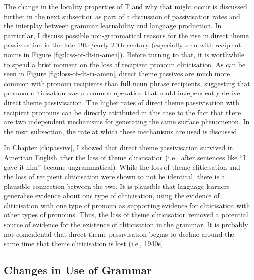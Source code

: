	The change in the locality properties of T and why that might occur is discussed further in the next subsection as part of a discussion of passivisation rates and the interplay between grammar learnability and language production. In particular, I discuss possible non-grammatical reasons for the rise in direct theme passivisation in the late 19th/early 20th century (especially seen with recipient nouns in Figure \ref{fig:loss-of-dt-in-amen}). Before turning to that, it is worthwhile to spend a brief moment on the loss of recipient pronoun cliticisation. As can be seen in Figure \ref{fig:loss-of-dt-in-amen}, direct theme passives are much more common with pronoun recipients than full noun phrase recipients, suggesting that pronoun cliticisation was a common operation that could independently derive direct theme passivisation. The higher rates of direct theme passivisation with recipient pronouns can be directly attributed in this case to the fact that there are two independent mechanisms for generating the same surface phenomenon. In the next subsection, the rate at which these mechanisms are used is discussed.
	
	In Chapter \ref{ch:passive}, I showed that direct theme passivisation survived in American English after the loss of theme cliticisation (i.e., after sentences like ``I gave it him'' became ungrammatical). While the loss of theme cliticisation and the loss of recipient cliticisation were shown to not be identical, there is a plausible connection between the two. It is plausible that language learners generalise evidence about one type of cliticisation, using the evidence of cliticisation with one type of pronoun as supporting evidence for cliticisation with other types of pronouns. Thus, the loss of theme cliticisation removed a potential source of evidence for the existence of cliticisation in the grammar. It is probably not coincidental that direct theme passivisation begins to decline around the same time that theme cliticisation is lost (i.e., 1940s).

	\subsection{Changes in Use of Grammar}

